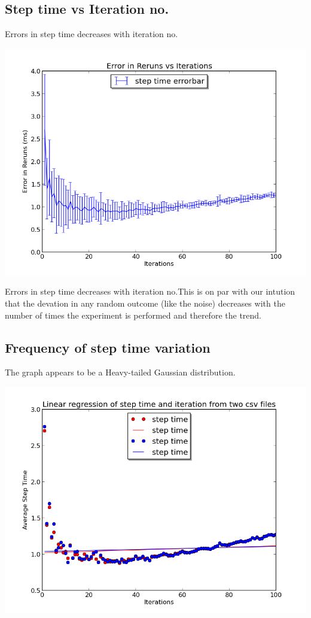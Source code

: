 \documentclass[11pt]{article}
\begin{document}
\subsection{Step time vs Iteration no.}
Errors in step time decreases with iteration no.
\begin{center}
\includegraphics[scale=0.6]{../details/images/g31_plot03.png}
\end{center}

Errors in step time decreases with iteration no.This is on par with our intution that the devation in any random outcome (like the noise) decreases with the number of times the experiment is performed and therefore the trend.\newline


\subsection{Frequency of step time variation}
The graph appears to be a Heavy-tailed Gaussian distribution.
\begin{center}
\includegraphics[scale=0.6]{../details/images/g31_plot04.png}
\end{center}
\end{document}
